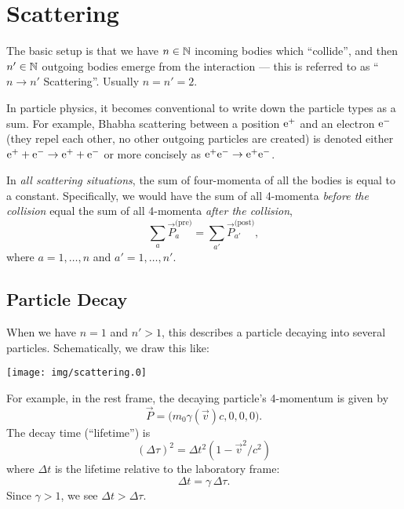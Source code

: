 \section{Scattering}

\M
The basic setup is that we have $n\in\mathbb{N}$ incoming bodies which
``collide'', and then $n'\in\mathbb{N}$ outgoing bodies emerge from the
interaction --- this is referred to as ``$n\to n'$ Scattering''.
Usually $n=n'=2$.

\begin{remark}
In particle physics, it becomes conventional to write down the particle
types as a sum. For example, Bhabha scattering between a position
$\mathrm{e}^{+}$ and an electron $\mathrm{e}^{-}$ (they repel each other, no other
outgoing particles are created) is denoted either
$\mathrm{e}^{+}+\mathrm{e}^{-}\to\mathrm{e}^{+}+\mathrm{e}^{-}$ or more concisely as $\mathrm{e}^{+}\mathrm{e}^{-}\to\mathrm{e}^{+}\mathrm{e}^{-}$.
\end{remark}

In \emph{all scattering situations}, the sum of four-momenta of all the bodies
is equal to a constant. Specifically, we would have the sum of all
4-momenta \emph{before the collision} equal the sum of all 4-momenta
\emph{after the collision},
\begin{equation}
\sum_{a}\vec{P}^{\text{(pre)}}_{a}
=\sum_{a'}\vec{P}^{\text{(post)}}_{a'},
\end{equation}
where $a=1,\dots,n$ and $a'=1,\dots,n'$.

\subsection{Particle Decay}

When we have $n=1$ and $n'>1$, this describes a particle decaying into
several particles. Schematically, we draw this like:
\begin{center}
  \texttt{[image: img/scattering.0]}
\end{center}

For example, in the rest frame, the decaying particle's 4-momentum is
given by
\begin{equation}
\vec{P} = \bigl(m_{0}\gamma(\vec{v})c, 0, 0, 0\bigr).
\end{equation}
The decay time (``lifetime'') is
\begin{equation}
(\Delta\tau)^{2} = \Delta t^{2}(1 - \vec{v}^{2}/c^{2})
\end{equation}
where $\Delta t$ is the lifetime relative to the laboratory frame:
\begin{equation}
\Delta t = \gamma\,\Delta\tau.
\end{equation}
Since $\gamma>1$, we see $\Delta t>\Delta\tau$.


